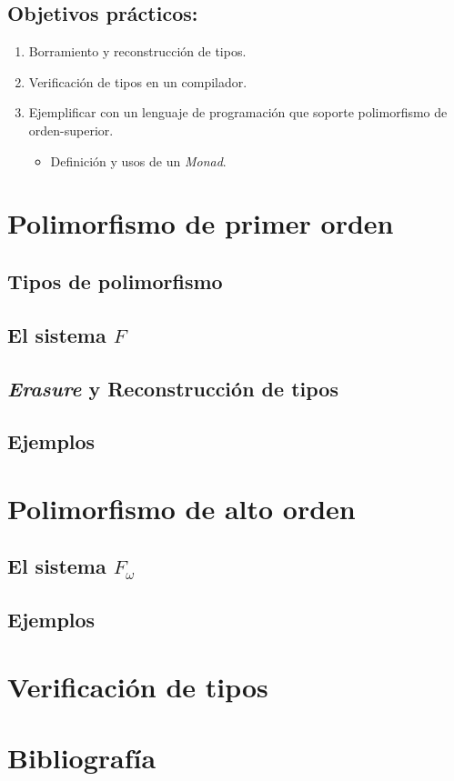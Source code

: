 \documentclass[spanish]{article}
\begin{document}
\subsection{Objetivos prácticos:}
\begin{enumerate}
\item Borramiento y reconstrucción de tipos.
\item Verificación de tipos en un compilador.
\item Ejemplificar con un lenguaje de programación que soporte polimorfismo de orden-superior.
  \begin{itemize}
  \item Definición y usos de un \textit{Monad}.
  \end{itemize}
\end{enumerate}

\section{Polimorfismo de primer orden}

\subsection{Tipos de polimorfismo}

\subsection{El sistema $F$}

\subsection{\textit{Erasure} y Reconstrucción de tipos}

\subsection{Ejemplos}

\section{Polimorfismo de alto orden}

\subsection{El sistema $F_\omega$}

\subsection{Ejemplos}

\section{Verificación de tipos}

\section{Bibliografía}
\end{document}
